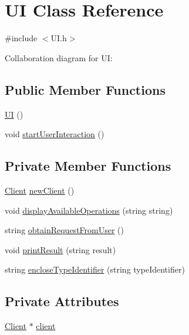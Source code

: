 \hypertarget{classUI}{}\section{UI Class Reference}
\label{classUI}


{\ttfamily \#include $<$U\+I.\+h$>$}



Collaboration diagram for UI\+:
\subsection*{Public Member Functions}
\begin{DoxyCompactItemize}
\item 
\mbox{\hyperlink{classUI_a675985a56b5e87ebdc8e5884b9f2ee09}{UI}} ()
\item 
void \mbox{\hyperlink{classUI_a018066cc2c5b54cbd51b1a89a29a1c67}{start\+User\+Interaction}} ()
\end{DoxyCompactItemize}
\subsection*{Private Member Functions}
\begin{DoxyCompactItemize}
\item 
\mbox{\hyperlink{classClient}{Client}} \mbox{\hyperlink{classUI_acdfe48d32141de368744ddd75d41d82d}{new\+Client}} ()
\item 
void \mbox{\hyperlink{classUI_abf905b724c7da571a7aa7b8e1a61e409}{display\+Available\+Operations}} (string string)
\item 
string \mbox{\hyperlink{classUI_a343fa5043d1f649ee433647539a721f0}{obtain\+Request\+From\+User}} ()
\item 
void \mbox{\hyperlink{classUI_aad7a4761b32253e43dcb76429deefcd3}{print\+Result}} (string result)
\item 
string \mbox{\hyperlink{classUI_a11fde47951c6781036418b9b2dd282ff}{enclose\+Type\+Identifier}} (string type\+Identifier)
\end{DoxyCompactItemize}
\subsection*{Private Attributes}
\begin{DoxyCompactItemize}
\item 
\mbox{\hyperlink{classClient}{Client}} $\ast$ \mbox{\hyperlink{classUI_a7bd176ddf21a242e884c010b4dcf756f}{client}}
\end{DoxyCompactItemize}


